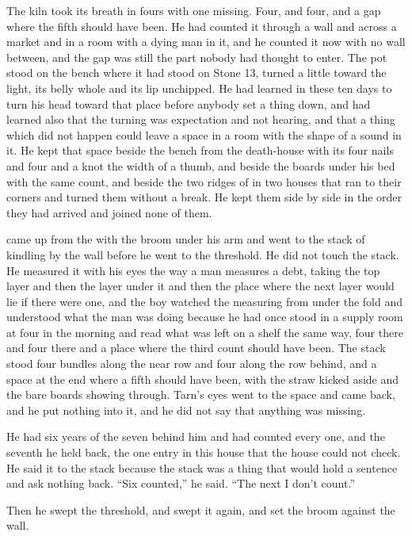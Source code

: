 The kiln took its breath in fours with one missing. Four, and four, and a gap where the fifth should have been. He had counted it through a wall and across a market and in a room with a dying man in it, and he counted it now with no wall between, and the gap was still the part nobody had thought to enter. The pot stood on the bench where it had stood on Stone 13, turned a little toward the light, its belly whole and its lip unchipped. He had learned in these ten days to turn his head toward that place before anybody set a thing down, and had learned also that the turning was expectation and not hearing, and that a thing which did not happen could leave a space in a room with the shape of a sound in it. He kept that space beside the bench from the death-house with its four nails and four and a knot the width of a thumb, and beside the boards under his bed with the same count, and beside the two ridges of  in two houses that ran to their corners and turned them without a break. He kept them side by side in the order they had arrived and joined none of them.

 came up from the  with the broom under his arm and went to the stack of kindling by the wall before he went to the threshold. He did not touch the stack. He measured it with his eyes the way a man measures a debt, taking the top layer and then the layer under it and then the place where the next layer would lie if there were one, and the boy watched the measuring from under the fold and understood what the man was doing because he had once stood in a supply room at four in the morning and read what was left on a shelf the same way, four there and four there and a place where the third count should have been. The stack stood four bundles along the near row and four along the row behind, and a space at the end where a fifth should have been, with the straw kicked aside and the bare boards showing through. Tarn's eyes went to the space and came back, and he put nothing into it, and he did not say that anything was missing.

He had six years of the seven behind him and had counted every one, and the seventh he held back, the one entry in this house that the house could not check. He said it to the stack because the stack was a thing that would hold a sentence and ask nothing back. “Six counted,” he said. “The next I don't count.”

Then he swept the threshold, and swept it again, and set the broom against the wall.

